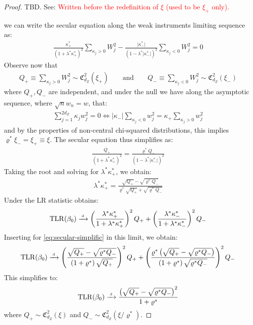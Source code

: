 \begin{proof}
    TBD. See: \textcolor{red}{Written before the redefinition of \(\xi\) (used to be \(\xi_+\) only). }

    we can write the secular equation along the weak instruments limiting sequence as:
\begin{align*}
    \frac{ \kappa_+^* }{(1+\lambda^*\kappa^*_+)^2}\sum_{\kappa_j>0}W_{j}^2
    -\frac{ \lvert\kappa_-^*\rvert }{(1-\lambda^*\lvert\kappa_-^*\rvert)^2}\sum_{\kappa_j<0}W_{j}^2  = 0
\end{align*}
Observe now that
\begin{align}
    Q_+ \equiv \sum_{\kappa_j>0}W_j^2 \sim \mathfrak{C}^2_{d_Z}(\xi_+)
    \qquad \text{and}
    \qquad
    Q_- \equiv \sum_{\kappa_j<0}W_j^2 \sim \mathfrak{C}^2_{d_Z}(\xi_-)
\end{align}
where \(Q_+,Q_-\) are independent, and under the null we have along the asymptotic sequence, where \(\sqrt{n}w_n=w\), that:
\begin{align*}
    \sum_{j=1}^{2d_Z}\kappa_jw_j^2 = 0
    \iff
        \lvert\kappa_-\rvert\sum_{\kappa_j<0}w_j^2 = \kappa_+\sum_{\kappa_j>0}w_j^2
\end{align*}
and by the properties of non-central chi-squared distributions, this implies \(\varrho^*\xi_- = \xi_+ \equiv \xi\).
The secular equation thus simplifies as:
\begin{align*}
    \frac{ Q_+ }{(1+\lambda^*\kappa^*_+)^2}
     = \frac{ \varrho^* Q_- }{(1-\lambda^*\lvert\kappa_-^*\rvert)^2}
\end{align*}
Taking the root and solving for \(\lambda^*\kappa_+^*\), we obtain:
\begin{align*}
\lambda^*\kappa_+^* =
    \frac{ \sqrt{Q_+}-\sqrt{\varrho^*Q_-}}{\varrho^*\sqrt{Q_+} + \sqrt{\varrho^*Q_-}}
    \label{eq:secular-simplific}
\end{align*}
Under  the LR statistic obtains:
\begin{align*}
    \mathrm{TLR}(\beta_0) \xrightarrow{{\scriptscriptstyle \mathrm{\;d\;}}}
     \left(\frac{\lambda^*  \kappa^*_+}{1+\lambda^* \kappa^*_+}\right)^2Q_++\left(\frac{\lambda^*  \kappa^*_-}{1+\lambda^* \kappa^*_-}\right)^2Q_-
\end{align*}
Inserting for \cref{eq:secular-simplific} in this limit, we obtain:
\begin{align*}
    \mathrm{TLR}(\beta_0) \xrightarrow{{\scriptscriptstyle \mathrm{\;d\;}}}
     \left(\frac{\sqrt{Q_+}-\sqrt{\varrho^* Q_-}}{\left(1+\varrho^*\right) \sqrt{Q_+}}\right)^2 Q_+
     +\left(\frac{\varrho^*\left(\sqrt{Q_+}-\sqrt{\varrho^* Q_-}\right)}{\left(1+\varrho^*\right) \sqrt{\varrho^* Q_-}}\right)^2 Q_-
\end{align*}
This simplifies to:
\begin{align}
    \mathrm{TLR}(\beta_0) \xrightarrow{{\scriptscriptstyle \mathrm{\;d\;}}}
    \frac{\left(\sqrt{Q_+}-\sqrt{\varrho^* Q_-}\right)^2}{1+\varrho^*}
\end{align}
where \(Q_+ \sim \mathfrak{C}^2_{d_Z}(\xi)\) and \(Q_- \sim \mathfrak{C}^2_{d_Z}(\xi/\varrho^*)\).
\end{proof}
